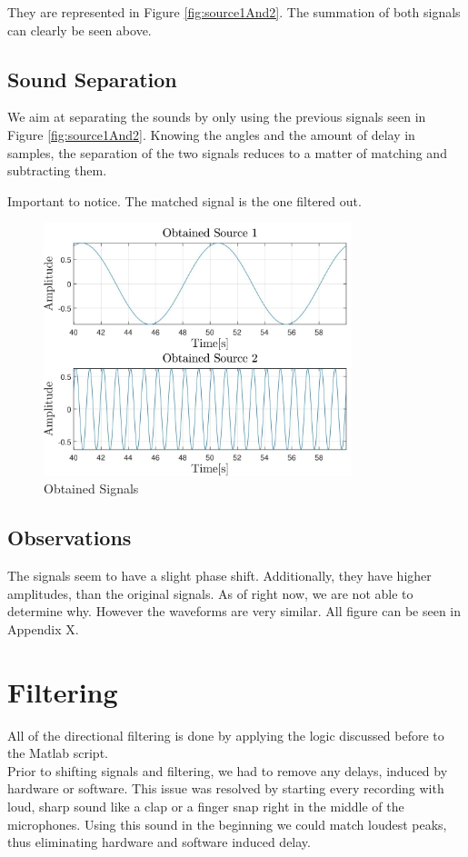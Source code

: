 They are represented in Figure \ref{fig:source1And2}. The summation of both signals can clearly 
be seen above.
\newpage
\subsection*{Sound Separation}
We aim at separating the sounds by only using the previous signals seen in Figure \ref{fig:source1And2}.
Knowing the angles and the amount of delay in samples, the separation of the two signals reduces to
a matter of matching and subtracting them. 

Important to notice. The matched signal is the one filtered out.
\begin{figure}[htp]
	\centering
	\includegraphics[width=0.8\textwidth]{Illustrations/obtainedSource1And2.jpg}
	\caption{Obtained Signals}
	\label{fig:obtainedSignals}
\end{figure}

\subsection*{Observations}
The signals seem to have a slight phase shift. Additionally, they have higher amplitudes, than the original
signals. As of right now, we are not able to determine why. However the waveforms are very similar.
All figure can be seen in Appendix X.
\newpage

\section{Filtering}
All of the directional filtering is done by applying the logic discussed before to the Matlab script.\\
Prior to shifting signals and filtering, we had to remove any delays, induced by hardware or software. This 
issue was resolved by starting every recording with loud, sharp sound like a clap or a finger snap right in 
the middle of the microphones. Using this sound in the beginning we could match loudest peaks, thus 
eliminating hardware and software induced delay. \\
